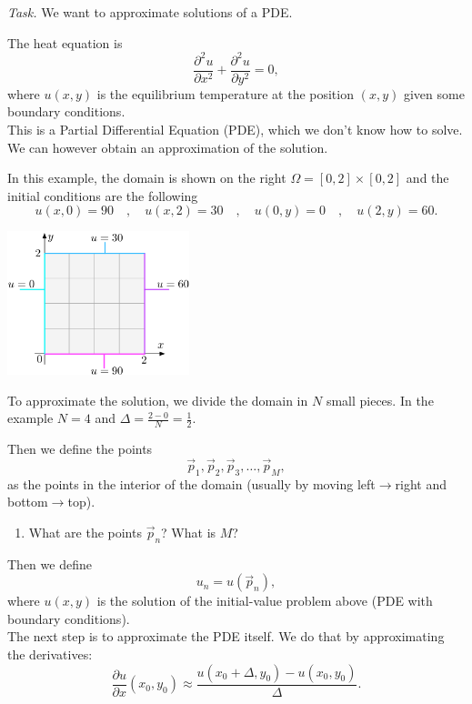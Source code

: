 \emph{Task. } We want to approximate solutions of a PDE. \\




\begin{minipage}{11cm}

The heat equation is
$$
\frac{\partial^2 u}{\partial x^2} + \frac{\partial^2 u}{\partial y^2} = 0,
$$
where $u(x,y)$ is the equilibrium temperature at the position $(x,y)$ given some boundary conditions. \\

This is a Partial Differential Equation (PDE), which we don't know how to solve. We can however obtain an approximation of the solution.

In this example, the domain is shown on the right $\Omega = [0,2] \times [0,2]$ and the initial conditions are the following
$$
u(x,0)=90 
\quad , \quad u(x,2)=30
\quad , \quad u(0,y)=0
\quad , \quad u(2,y)=60.
$$
\hfill
\end{minipage}
\hfill
\begin{minipage}{150pt}
\includegraphics*[width=150pt]{images/project-numericalPDE-domain.pdf}
\end{minipage}

To approximate the solution, we divide the domain in $N$ small pieces. In the example $N=4$ and $\Delta = \frac{2-0}{N}=\frac12$.

Then we define the points
$$
\vec{p}_1, \vec{p}_2, \vec{p}_3, \ldots , \vec{p}_M,
$$
as the points in the interior of the domain (usually by moving left$\to$right and bottom$\to$top).

\begin{enumerate}[label=\emph{\arabic*.}] 
\item What are the points $\vec{p}_n$? What is $M$?
\end{enumerate}

Then we define
$$
u_n = u(\vec{p}_n),
$$
where $u(x,y)$ is the solution of the initial-value problem above (PDE with boundary conditions). \\

The next step is to approximate the PDE itself. We do that by approximating the derivatives:
$$
\frac{\partial u}{\partial x}(x_0,y_0) \approx \frac{u(x_0+\Delta,y_0)-u(x_0,y_0)}{\Delta}.
$$

